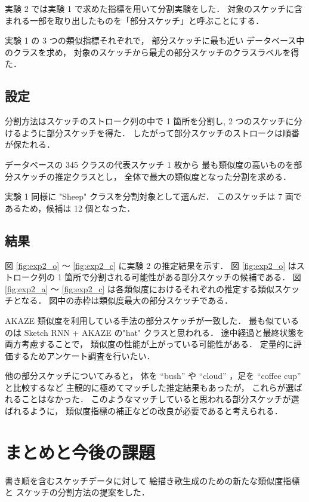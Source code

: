 \documentclass[twocolumn]{jarticle}     %
\begin{document}
実験 2 では実験 1 で求めた指標を用いて分割実験をした．
対象のスケッチに含まれる一部を取り出したものを「部分スケッチ」と呼ぶことにする．

実験 1 の 3 つの類似指標それぞれで，
部分スケッチに最も近い データベース中のクラスを求め，
対象のスケッチから最尤の部分スケッチのクラスラベルを得た．


\subsection{設定}
分割方法はスケッチのストローク列の中で 1 箇所を分割し, 2 つのスケッチに分けるように部分スケッチを得た．
したがって部分スケッチのストロークは順番が保たれる．

データベースの 345 クラスの代表スケッチ 1 枚から
最も類似度の高いものを部分スケッチの推定クラスとし，
全体で最大の類似度となった分割を求める．

実験 1 同様に "Sheep" クラスを分割対象として選んだ．
このスケッチは 7 画であるため，候補は 12 個となった．

\subsection{結果}

図 \ref{fig:exp2_o} ～ \ref{fig:exp2_c} に実験 2 の推定結果を示す．
図 \ref{fig:exp2_o} はストローク列の 1 箇所で分割される可能性がある部分スケッチの候補である．
図 \ref{fig:exp2_a} ～ \ref{fig:exp2_c} は各類似度におけるそれぞれの推定する類似スケッチとなる．
図中の赤枠は類似度最大の部分スケッチである．

AKAZE 類似度を利用している手法の部分スケッチが一致した．
最も似ているのは Sketch RNN + AKAZE の"hat" クラスと思われる．
途中経過と最終状態を両方考慮することで，
類似度の性能が上がっている可能性がある．
定量的に評価するためアンケート調査を行いたい．

他の部分スケッチについてみると，
体を “bush” や “cloud” ，足を “coffee cup” と比較するなど
主観的に極めてマッチした推定結果もあったが，
これらが選ばれることはなかった．
このようなマッチしていると思われる部分スケッチが選ばれるように，
類似度指標の補正などの改良が必要であると考えられる．


\section{まとめと今後の課題}

書き順を含むスケッチデータに対して
絵描き歌生成のための新たな類似度指標と
スケッチの分割方法の提案をした．
\end{document}
